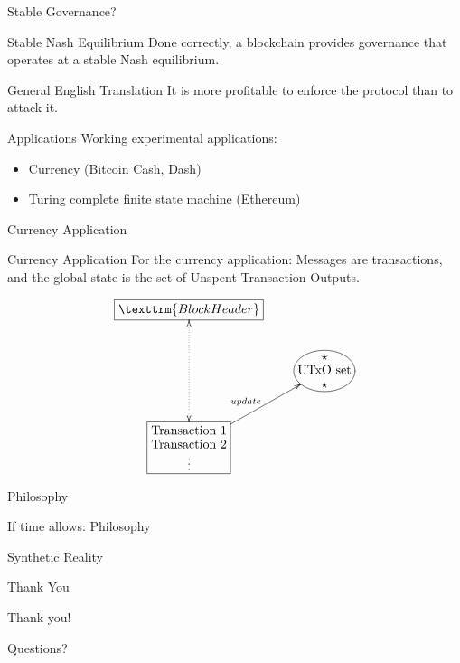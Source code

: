 \documentclass{beamer}
\begin{document}
\begin{frame}{Stable Governance?}

  \begin{block}{Stable Nash Equilibrium}
    Done correctly, a blockchain provides governance that operates at a stable Nash equilibrium.
  \end{block}

  \pause

  \begin{block}{General English Translation}
    It is more profitable to enforce the protocol than to attack it.
  \end{block}

\end{frame}

\begin{frame}{Applications}
  Working experimental applications:
  \begin{itemize}
    \item Currency (Bitcoin Cash, Dash)
    \item Turing complete finite state machine (Ethereum)
  \end{itemize}
  
\end{frame}

\begin{frame}{Currency Application}
  \begin{block}{Currency Application}
    For the currency application:  Messages are transactions, and the global state is the set of Unspent
    Transaction Outputs.  
  \end{block}

  \[  
  \xymatrix{
    *+[F]{\texttrm{Block Header}} \ar@{<.>}[dd]\\
      & *+[F]@*[o]{\txt{$\star$\\ UTxO set \\$\star$}} \\
    *+[F]{\txt{Transaction 1 \\ Transaction 2 \\ \vdots} } \ar[ur]^{update}} 
  \]  


\end{frame}

\begin{frame}{Philosophy}
  \begin{center}
  If time allows:  Philosophy\\
  \vspace{0.5 in}
  \pause

  Synthetic Reality
  \end{center}
\end{frame}

\begin{frame}{Thank You}
  \begin{center}
  Thank you! \\
  \vspace{0.5 in}

  \pause
  
  Questions?
  \end{center}
\end{frame}

\end{document}
